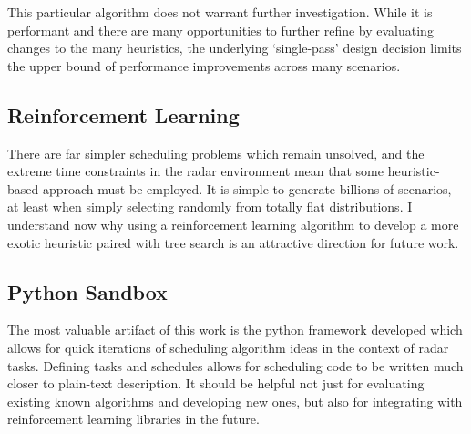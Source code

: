 \documentclass[conference]{IEEEtran}
\begin{document}
This particular algorithm does not warrant further investigation.
While it is performant and there are many opportunities to further refine by evaluating changes to the many heuristics,
the underlying `single-pass' design decision limits the upper bound of performance improvements across many scenarios.

\subsection{Reinforcement Learning}

There are far simpler scheduling problems which remain unsolved, and the extreme time constraints in the radar environment mean that some heuristic-based approach must be employed.
It is simple to generate billions of scenarios, at least when simply selecting randomly from totally flat distributions.
I understand now why using a reinforcement learning algorithm to develop a more exotic heuristic paired with tree search is an attractive direction for future work.

\subsection{Python Sandbox}

The most valuable artifact of this work is the python framework developed which allows for quick iterations of scheduling algorithm ideas in the context of radar tasks.
Defining tasks and schedules allows for scheduling code to be written much closer to plain-text description.
It should be helpful not just for evaluating existing known algorithms and developing new ones, but also for integrating with reinforcement learning libraries in the future.




\end{document}
